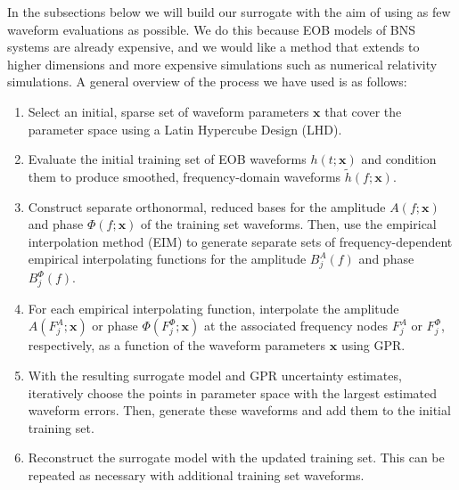 \documentclass[prd,aps,letter,twocolumn,floatfix,notitlepage,nofootinbib]{revtex4-1}
\def\bx{\mathbf{x}}
\begin{document}

In the subsections below we will build our surrogate with the aim of using as few waveform evaluations as possible. We do this because EOB models of BNS systems are already expensive, and we would like a method that extends to higher dimensions and more expensive simulations such as numerical relativity simulations. A general overview of the process we have used is as follows:
\begin{enumerate}
\item Select an initial, sparse set of waveform parameters $\bx$ that cover the parameter space using a Latin Hypercube Design (LHD).

\item Evaluate the initial training set of EOB waveforms $h(t;\bx)$ and condition them to produce smoothed, frequency-domain waveforms $\tilde h(f;\bx)$.

\item Construct separate orthonormal, reduced bases for the amplitude $A(f;\bx)$ and phase $\Phi(f;\bx)$ of the training set waveforms. Then, use the empirical interpolation method (EIM) to generate separate sets of frequency-dependent empirical interpolating functions for the amplitude $B^A_j(f)$ and phase $B^\Phi_j(f)$.

\item For each empirical interpolating function, interpolate the amplitude $A(F^A_j;\bx)$ or phase $\Phi(F^\Phi_j;\bx)$ at the associated frequency nodes $F^A_j$ or $F^\Phi_j$, respectively, as a function of the waveform parameters $\bx$ using GPR.

\item With the resulting surrogate model and GPR uncertainty estimates, iteratively choose the points in parameter space with the largest estimated waveform errors. Then, generate these waveforms and add them to the initial training set.

\item Reconstruct the surrogate model with the updated training set. This can be repeated as necessary with additional training set waveforms.

\end{enumerate}
\end{document}
